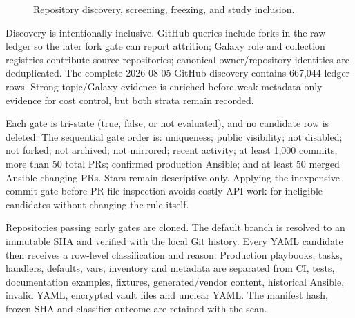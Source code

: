 \begin{figure}[H]
\centering
{}
\caption{Repository discovery, screening, freezing, and study inclusion.}
\label{fig:repository_selection}
\end{figure}

Discovery is intentionally inclusive. GitHub queries include forks in the raw
ledger so the later fork gate can report attrition; Galaxy role and collection
registries contribute source repositories; canonical owner/repository
identities are deduplicated. The complete 2026-08-05 GitHub discovery contains
667,044 ledger rows. Strong topic/Galaxy evidence is enriched before weak
metadata-only evidence for cost control, but both strata remain recorded.

Each gate is tri-state (true, false, or not evaluated), and no candidate row is
deleted. The sequential gate order is: uniqueness; public visibility; not
disabled; not forked; not archived; not mirrored; recent activity; at least
1,000 commits; more than 50 total PRs; confirmed production Ansible; and at
least 50 merged Ansible-changing PRs. Stars remain descriptive only. Applying
the inexpensive commit gate before PR-file inspection avoids costly API work
for ineligible candidates without changing the rule itself.

Repositories passing early gates are cloned. The default branch is resolved to
an immutable SHA and verified with the local Git history. Every YAML candidate
then receives a row-level classification and reason. Production playbooks,
tasks, handlers, defaults, vars, inventory and metadata are separated from CI,
tests, documentation examples, fixtures, generated/vendor content, historical
Ansible, invalid YAML, encrypted vault files and unclear YAML. The manifest
hash, frozen SHA and classifier outcome are retained with the scan.

